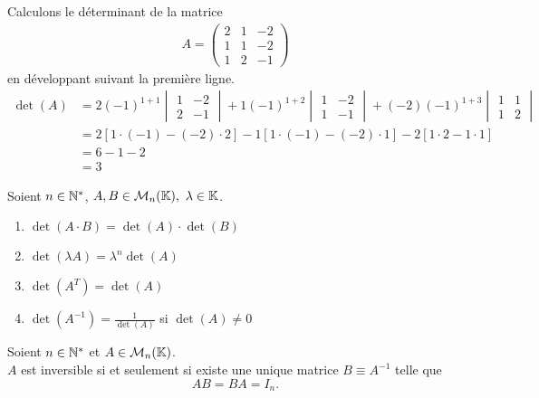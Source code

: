 \begin{example}
	Calculons le déterminant de la matrice 
	\begin{align*}
		A = 
		\begin{pmatrix}
		2 & 1 & -2 \\
		1 & 1 & -2 \\
		1 & 2 & -1
		\end{pmatrix}
	\end{align*}
	en développant suivant la première ligne.
	\begin{align*}
		\det(A) &= 2 (-1)^{1+1} 
		\begin{vmatrix}
			1 & -2 \\
			2 & -1	
		\end{vmatrix}			
		+ 1 (-1)^{1 + 2}
		\begin{vmatrix}
			1 & -2 \\
			1 & -1
		\end{vmatrix}
		+ (-2) (-1)^{1 + 3}
		\begin{vmatrix}
			1 & 1 \\
			1 & 2
		\end{vmatrix}
		\\
		&=
		2[1 \cdot (-1) - (-2) \cdot 2] -1[1 \cdot (-1) - (-2) \cdot 1] -2 [1 \cdot 2 - 1 \cdot 1]
		\\
		&= 6 - 1 - 2 \\
		&= 3
	\end{align*}
\end{example}

\begin{proposition}
	Soient $n \in \mathbb{N}^*$, $A, B \in \mathcal{M}_n(\mathbb{K}),\ \lambda \in \mathbb{K}$.
	\begin{multicols}{2}
	    \begin{enumerate}
		\item $\det(A \cdot B) = \det(A) \cdot \det(B)$
		\item $\det(\lambda A) = \lambda^n \det(A)$
		\item $\det(A^T) = \det(A)$
		\item $\det(A^{-1}) = \frac{1}{\det(A)}$ si $\det(A) \neq 0$
	\end{enumerate}
	\end{multicols}
\end{proposition}

\begin{definition}
	Soient $n \in \mathbb{N}^*$ et $A \in \mathcal{M}_n(\mathbb{K})$.
	\\
	$A$ est inversible si et seulement si existe une unique matrice $B \equiv A^{-1}$ telle que 
	\[AB = BA = I_n.\]
\end{definition}


